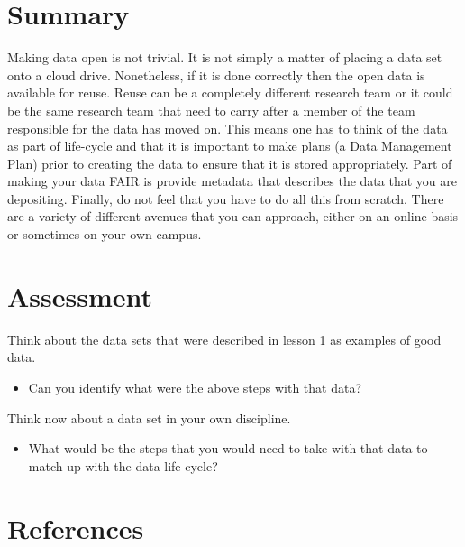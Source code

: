 \documentclass[
  letterpaper,
  DIV=11,
  numbers=noendperiod]{scrreport}
\providecommand{\tightlist}{%
  \setlength{\itemsep}{0pt}\setlength{\parskip}{0pt}}\usepackage{longtable,booktabs,array}
\begin{document}
\hypertarget{summary-13}{%
\section{Summary}\label{summary-13}}

Making data open is not trivial. It is not simply a matter of placing a
data set onto a cloud drive. Nonetheless, if it is done correctly then
the open data is available for reuse. Reuse can be a completely
different research team or it could be the same research team that need
to carry after a member of the team responsible for the data has moved
on. This means one has to think of the data as part of life-cycle and
that it is important to make plans (a Data Management Plan) prior to
creating the data to ensure that it is stored appropriately. Part of
making your data FAIR is provide metadata that describes the data that
you are depositing. Finally, do not feel that you have to do all this
from scratch. There are a variety of different avenues that you can
approach, either on an online basis or sometimes on your own campus.

\hypertarget{assessment-3}{%
\section{Assessment}\label{assessment-3}}

Think about the data sets that were described in lesson 1 as examples of
good data.

\begin{itemize}
\tightlist
\item
  Can you identify what were the above steps with that data?
\end{itemize}

Think now about a data set in your own discipline.

\begin{itemize}
\tightlist
\item
  What would be the steps that you would need to take with that data to
  match up with the data life cycle?
\end{itemize}

\hypertarget{references-6}{%
\section{References}\label{references-6}}
\end{document}
